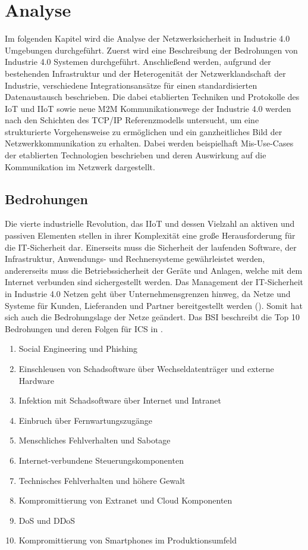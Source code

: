 \chapter{Analyse}
\label{Analyse}
Im folgenden Kapitel wird die Analyse der Netzwerksicherheit in Industrie 4.0 Umgebungen durchgeführt. Zuerst wird eine Beschreibung der Bedrohungen von Industrie 4.0 Systemen durchgeführt. Anschließend werden, aufgrund der bestehenden Infrastruktur und der Heterogenität der Netzwerklandschaft der Industrie, verschiedene Integrationsansätze für einen standardisierten Datenaustausch beschrieben. Die dabei etablierten Techniken und Protokolle des \ac{IoT} und \ac{IIoT} sowie neue \ac{M2M} Kommunikationswege der Industrie 4.0 werden nach den Schichten des \ac{TCP}/\ac{IP} Referenzmodells untersucht, um eine strukturierte Vorgehensweise zu ermöglichen und ein ganzheitliches Bild der Netzwerkkommunikation zu erhalten. Dabei werden beispielhaft Mis-Use-Cases der etablierten Technologien beschrieben und deren Auswirkung auf die Kommunikation im Netzwerk dargestellt.

\section{Bedrohungen}
\label{Analyse:Bedrohungen}
Die vierte industrielle Revolution, das \ac{IIoT} und dessen Vielzahl an aktiven und passiven Elementen stellen in ihrer Komplexität eine große Herausforderung für die IT-Sicherheit dar. Einerseits muss die Sicherheit der laufenden Software, der Infrastruktur, Anwendungs- und Rechnersysteme gewährleistet werden, andererseits muss die Betriebssicherheit der Geräte und Anlagen, welche mit dem Internet verbunden sind sichergestellt werden. Das Management der IT-Sicherheit in Industrie 4.0 Netzen geht über Unternehmensgrenzen hinweg, da Netze und Systeme für Kunden, Lieferanden und Partner bereitgestellt werden (\cite{DTAG2016}). Somit hat sich auch die Bedrohungslage der Netze geändert. Das \ac{BSI} beschreibt die Top 10 Bedrohungen und deren Folgen für \ac{ICS} in \cite{ICSSec2016}.

\begin{enumerate}
    \item Social Engineering und Phishing
    \item Einschleusen von Schadsoftware über Wechseldatenträger und externe Hardware
    \item Infektion mit Schadsoftware über Internet und Intranet
    \item Einbruch über Fernwartungszugänge
    \item Menschliches Fehlverhalten und Sabotage
    \item Internet-verbundene Steuerungskomponenten
    \item Technisches Fehlverhalten und höhere Gewalt
    \item Kompromittierung von Extranet und Cloud Komponenten
    \item \ac{DoS} und \ac{DDoS}
    \item Kompromittierung von Smartphones im Produktionsumfeld
\end{enumerate}

